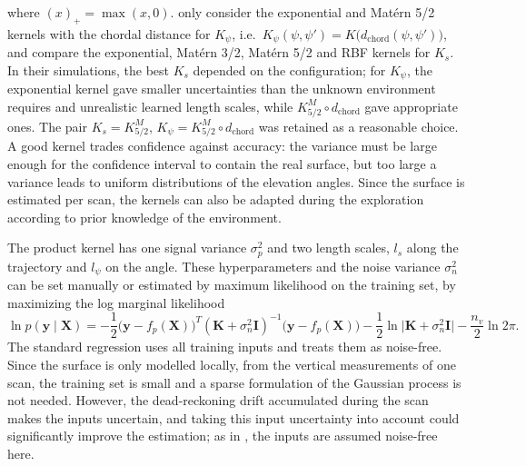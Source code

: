 where $(x)_+ = \max(x, 0)$. \citet{breux2020elevation} only consider the exponential and Mat\'ern 5/2
kernels with the chordal distance for $K_\psi$, i.e.\
$K_\psi(\psi, \psi') = K\big(d_{\mathrm{chord}}(\psi, \psi')\big)$, and compare the exponential,
Mat\'ern 3/2, Mat\'ern 5/2 and RBF kernels for $K_s$. In their simulations, the best $K_s$ depended on
the configuration; for $K_\psi$, the exponential kernel gave smaller uncertainties than the unknown
environment requires and unrealistic learned length scales, while
$K^M_{5/2} \circ d_{\mathrm{chord}}$ gave appropriate ones. The pair $K_s = K^M_{5/2}$,
$K_\psi = K^M_{5/2} \circ d_{\mathrm{chord}}$ was retained as a reasonable choice. A good kernel
trades confidence against accuracy: the variance must be large enough for the confidence interval
to contain the real surface, but too large a variance leads to uniform distributions of the
elevation angles. Since the surface is estimated per scan, the kernels can also be adapted during
the exploration according to prior knowledge of the environment.

The product kernel has one signal variance $\sigma_p^2$ and two length scales, $l_s$ along the
trajectory and $l_\psi$ on the angle. These hyperparameters and the noise variance $\sigma_n^2$ can be
set manually or estimated by maximum likelihood on the training set, by maximizing the log marginal
likelihood \citep{rasmussen2006gaussian}
\begin{equation}                         %
  \ln p(\mathbf{y} \mid \mathbf{X}) = -\frac{1}{2}\big(\mathbf{y} - f_p(\mathbf{X})\big)^T
  (\mathbf{K} + \sigma_n^2\mathbf{I})^{-1}\big(\mathbf{y} - f_p(\mathbf{X})\big)
  - \frac{1}{2}\ln\big|\mathbf{K} + \sigma_n^2\mathbf{I}\big| - \frac{n_v}{2}\ln 2\pi.
  \label{eq:msis_marglik}
\end{equation}
The standard regression uses all training inputs and treats them as noise-free. Since the surface is
only modelled locally, from the vertical measurements of one scan, the training set is small and a
sparse formulation of the Gaussian process is not needed. However, the dead-reckoning drift
accumulated during the scan makes the inputs uncertain, and taking this input uncertainty into
account could significantly improve the estimation; as in \citet{breux2020elevation}, the inputs are
assumed noise-free here.


